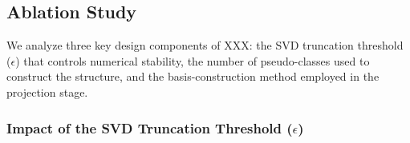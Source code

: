 \documentclass[final,twocolumn,10pt]{elsarticle}
\begin{document}
\begin{table}[t]
\caption{Scalability analysis of XXX: Training and per-sample inference time (in seconds) across varying data scales $N$ and feature dimensions $d$.}
\centering

\label{tab:scale_efficiency}
\end{table}

\subsection{Ablation Study}

We analyze three key design components of XXX: the SVD truncation threshold ($\epsilon$) that controls numerical stability, the number of pseudo-classes used to construct the structure, and the basis-construction method employed in the projection stage.


\subsubsection{Impact of the SVD Truncation Threshold ($\epsilon$)}
\label{subsubsec:ablation_epsilon}
\end{document}
